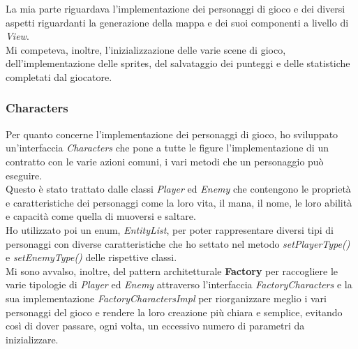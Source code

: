 \textsf{\small La mia parte riguardava l'implementazione dei personaggi di gioco e dei diversi aspetti riguardanti la generazione della mappa e dei suoi componenti a livello di \emph{View}.}\\

\textsf{\small Mi competeva, inoltre, l'inizializzazione delle varie scene di gioco, dell'implementazione delle sprites, del salvataggio dei punteggi e delle statistiche completati dal giocatore.}\\ 

\subsubsection*{Characters}

\textsf{\small Per quanto concerne l'implementazione dei personaggi di gioco, ho sviluppato un'interfaccia \emph{Characters} che pone a tutte le figure l'implementazione di un contratto con le varie azioni comuni, i vari metodi che un personaggio può eseguire.}\\

\textsf{\small Questo è stato trattato dalle classi \emph{Player} ed \emph{Enemy} che contengono le proprietà e caratteristiche dei personaggi come la loro vita, il mana, il nome, le loro abilità e capacità come quella di muoversi e saltare.}\\

\textsf{\small Ho utilizzato poi un enum, \emph{EntityList}, per poter rappresentare diversi tipi di personaggi con diverse caratteristiche che ho settato nel metodo \emph{setPlayerType()} e \emph{setEnemyType()} delle rispettive classi. }\\

\textsf{\small Mi sono avvalso, inoltre, del pattern architetturale \textbf{Factory} per raccogliere le varie tipologie di \emph{Player} ed \emph{Enemy} attraverso l'interfaccia \emph{FactoryCharacters} e la sua implementazione \emph{FactoryCharactersImpl} per riorganizzare meglio i vari personaggi del gioco e rendere la loro creazione più chiara e semplice, evitando così di dover passare, ogni volta, un eccessivo numero di parametri da inizializzare.}

